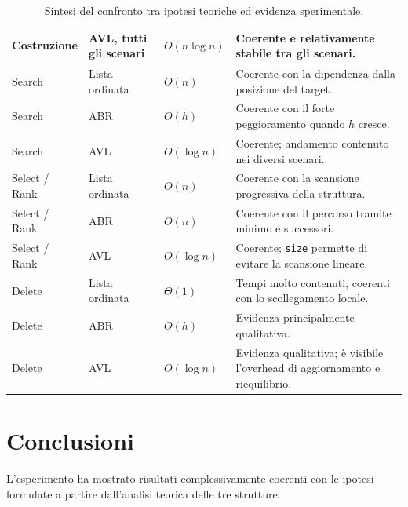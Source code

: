 \documentclass[a4paper,11pt]{article}
\begin{document}
\begin{table}[H]
\begin{tabular}{
        p{2.4cm}
        p{2.6cm}
        p{3.4cm}
        p{5.0cm}
    }
        Costruzione
        & AVL, tutti gli scenari
        & $O(n\log n)$
        & Coerente e relativamente stabile tra gli scenari. \\

        \midrule

        Search
        & Lista ordinata
        & $O(n)$
        & Coerente con la dipendenza dalla posizione del target. \\

        Search
        & ABR
        & $O(h)$
        & Coerente con il forte peggioramento quando $h$ cresce. \\

        Search
        & AVL
        & $O(\log n)$
        & Coerente; andamento contenuto nei diversi scenari. \\

        Select / Rank
        & Lista ordinata
        & $O(n)$
        & Coerente con la scansione progressiva della struttura. \\

        Select / Rank
        & ABR
        & $O(n)$
        & Coerente con il percorso tramite minimo e successori. \\

        Select / Rank
        & AVL
        & $O(\log n)$
        & Coerente; \texttt{size} permette di evitare la scansione lineare. \\

        Delete
        & Lista ordinata
        & $\Theta(1)$
        & Tempi molto contenuti, coerenti con lo scollegamento locale. \\

        Delete
        & ABR
        & $O(h)$
        & Evidenza principalmente qualitativa. \\

        Delete
        & AVL
        & $O(\log n)$
        & Evidenza qualitativa; è visibile l'overhead di aggiornamento e riequilibrio. \\

        \bottomrule
    \end{tabular}
    \caption{Sintesi del confronto tra ipotesi teoriche ed evidenza sperimentale.}
     \label{tab:sintesi-ipotesi-risultati}
\end{table}


\clearpage
\section{Conclusioni} 
L'esperimento ha mostrato risultati complessivamente coerenti con le ipotesi formulate a partire dall'analisi teorica delle tre strutture.
\end{document}
